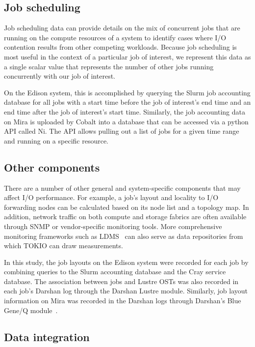 \subsection{Job scheduling} \label{sec:methods/scheduling}

Job scheduling data can provide details on the mix of concurrent jobs that are running on the compute resources of a system to identify cases where I/O contention results from other competing workloads.
Because job scheduling is most useful in the context of a particular job of interest, we represent this data as a single scalar value that represents the number of other jobs running concurrently with our job of interest.

On the Edison system, this is accomplished by querying the Slurm job accounting database for all jobs with a start time before the job of interest's end time and an end time after the job of interest's start time.
Similarly, the job accounting data on Mira is uploaded by Cobalt into a database that can be accessed via a python API called Ni.
The API allows pulling out a list of jobs for a given time range and running on a specific resource.

\subsection{Other components} \label{sec:methods/other}

There are a number of other general and system-specific components that may affect I/O performance.  For example, a job's layout and locality to I/O forwarding nodes can be calculated based on its node list and a topology map.
In addition, network traffic on both compute and storage fabrics are often available through SNMP or vendor-specific monitoring tools.
More comprehensive monitoring frameworks such as LDMS~\cite{7013000} can also serve as data repositories from which TOKIO can draw measurements.

In this study, the job layouts on the Edison system were recorded for each job by combining queries to the Slurm accounting database and the Cray service database.
The association between jobs and Lustre OSTs was also recorded in each job's Darshan log through the Darshan Lustre module.
Similarly, job layout information on Mira was recorded in the Darshan logs through Darshan's Blue Gene/Q module~\cite{snyder2016modular}.

\subsection{Data integration} \label{sec:data-integration}

